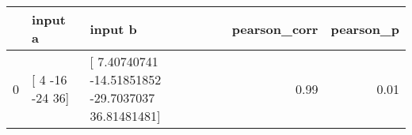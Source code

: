 \begin{tabular}{lllrr}
\toprule
 & input a & input b & pearson\_corr & pearson\_p \\
\midrule
0 & [  4 -16 -24  36] & [  7.40740741 -14.51851852 -29.7037037   36.81481481] & 0.99 & 0.01 \\
\bottomrule
\end{tabular}

